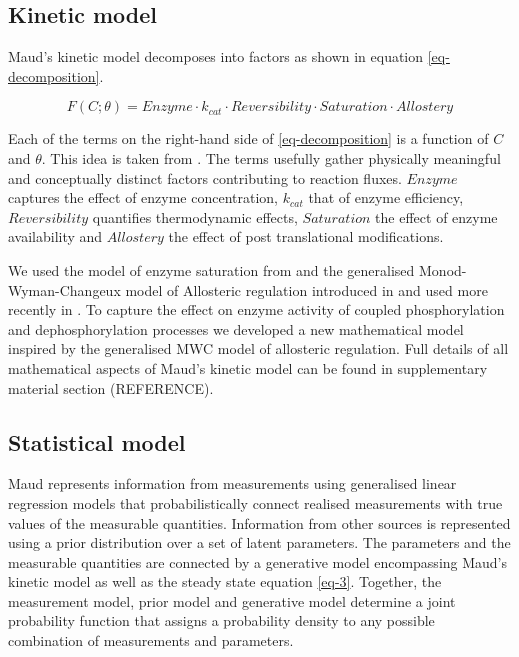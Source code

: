 \documentclass[journal=,manuscript=]{achemso}
\begin{document}
\hypertarget{kinetic-model}{%
\subsection{Kinetic model}\label{kinetic-model}}

Maud's kinetic model decomposes into factors as shown in equation
\eqref{eq-decomposition}.

\begin{equation}
F(C;\theta) = Enzyme\cdot k_{cat}\cdot Reversibility \cdot Saturation \cdot Allostery \label{eq-decomposition}
\end{equation}

Each of the terms on the right-hand side of \eqref{eq-decomposition} is
a function of \(C\) and \(\theta\). This idea is taken from
\citet{noor_note_2013}. The terms usefully gather physically meaningful
and conceptually distinct factors contributing to reaction fluxes.
\(Enzyme\) captures the effect of enzyme concentration, \(k_{cat}\) that
of enzyme efficiency, \(Reversibility\) quantifies thermodynamic
effects, \(Saturation\) the effect of enzyme availability and
\(Allostery\) the effect of post translational modifications.

We used the model of enzyme saturation from
\citet{liebermeister_modular_2010} and the generalised
Monod-Wyman-Changeux model of Allosteric regulation introduced in
\citep{monod_nature_1965, changeux_2013, popova_generalization_1975, popova_description_1979}
and used more recently in \citet{matosGRASPComputationalPlatform2022}.
To capture the effect on enzyme activity of coupled phosphorylation and
dephosphorylation processes we developed a new mathematical model
inspired by the generalised MWC model of allosteric regulation. Full
details of all mathematical aspects of Maud's kinetic model can be found
in supplementary material section (REFERENCE).

\hypertarget{statistical-model}{%
\subsection{Statistical model}\label{statistical-model}}

Maud represents information from measurements using generalised linear
regression models that probabilistically connect realised measurements
with true values of the measurable quantities. Information from other
sources is represented using a prior distribution over a set of latent
parameters. The parameters and the measurable quantities are connected
by a generative model encompassing Maud's kinetic model as well as the
steady state equation \eqref{eq-3}. Together, the measurement model,
prior model and generative model determine a joint probability function
that assigns a probability density to any possible combination of
measurements and parameters.
\end{document}
